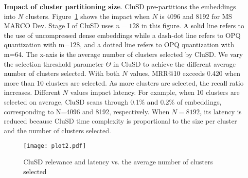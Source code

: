 \textbf{Impact of  cluster partitioning size}.
CluSD pre-partitions the embeddings into $N$ clusters. 
Figure~\ref{fig:ncluster} shows the impact when $N$ is  4096 and  8192 for MS MARCO Dev.
Stage I of CluSD uses  $n=128$ in this figure. 
A  solid line refers to the use of uncompressed dense embeddings while  a dash-dot line refers to OPQ quantization with m=128, 
and a dotted line refers to OPQ quantization  with m=64. The x-axis is the average number of clusters selected by CluSD.
We vary the selection threshold parameter $\Theta$ in CluSD to achieve the different 
average number of clusters selected. 
With both $N$ values,
MRR@10 exceeds 0.420 when more than 10 clusters are selected.
As more clusters are selected,  the recall ratio increases. 
Different $N$ values impact latency. 
For example, when 10 clusters are selected on average, 
CluSD  scans through 0.1\% and  0.2\% of embeddings, corresponding to N=4096 and 8192, respectively. 
When $N= 8192$, its latency is reduced
because CluSD time complexity is proportional  to  the size per cluster and the number of clusters selected.
 \vspace*{-5mm}
\begin{figure}[h!]
    \centering
    \texttt{[image: plot2.pdf]}
    \caption{CluSD relevance and latency vs.  the average  number of clusters selected }
    \label{fig:ncluster}
 \vspace*{-4mm}
\end{figure}

